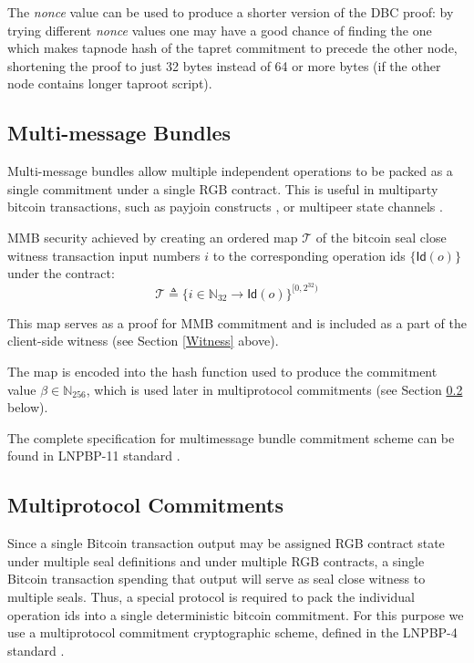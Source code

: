 \documentclass[9pt,oneside]{amsart}
\begin{document}
\begin{multicols}{2}
The \emph{nonce} value can be used to produce a shorter version of the DBC proof:
by trying different \emph{nonce} values one may have a good chance of finding the one
which makes tapnode hash of the tapret commitment to precede the other node,
shortening the proof to just 32 bytes instead of 64 or more bytes
(if the other node contains longer taproot script).


\subsection{Multi-message Bundles}\label{MMB}

Multi-message bundles allow multiple independent operations
to be packed as a single commitment under a single RGB contract.
This is useful in multiparty bitcoin transactions,
such as payjoin constructs \cite{payjoin}, or multipeer state channels \cite{nucleus}.

MMB security achieved by creating an ordered map $\mathcal{T}$ of
the bitcoin \gls{seal close witness transaction} input numbers $i$
to the corresponding operation ids $\{ \mathsf{Id}(o) \}$ under the contract:
\noindent
\begin{equation}
    \mathcal{T} \triangleq \{ i \in \mathbb{N}_{32} \rightarrow \mathsf{Id}(o) \}^{[0, 2^{32})}
\end{equation}

This map serves as a proof for MMB commitment and is included as a part of the
\gls{client-side witness} (see Section \ref{Witness} above).

The map is encoded into the hash function
used to produce the commitment value $\beta \in \mathbb{N}_{256}$,
which is used later in multiprotocol commitments (see Section \ref{MPC} below).

The complete specification for multimessage bundle commitment scheme
can be found in LNPBP-11 standard \cite{LNPBP11}.

\subsection{Multiprotocol Commitments}\label{MPC}

Since a single Bitcoin transaction output may be assigned RGB contract state
under multiple seal definitions and under multiple RGB contracts,
a single Bitcoin transaction spending that output will serve as
\gls{seal close witness} to multiple seals.
Thus, a special protocol is required to pack the individual operation ids
into a single deterministic bitcoin commitment.
For this purpose we use a multiprotocol commitment cryptographic scheme,
defined in the LNPBP-4 standard \cite{LNPBP4}.


\end{multicols}
\end{document}
